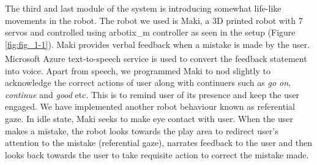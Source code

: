 The third and last module of the system is introducing somewhat life-like movements in the robot. The robot we used is Maki, a 3D printed robot with 7 servos and controlled using arbotix\_m controller as seen in the setup (Figure \ref{fig:fig_1-1}). Maki provides verbal feedback when a mistake is made by the user. Microsoft\textsuperscript\textregistered{} Azure text-to-speech service is used to convert the feedback statement into voice. Apart from speech, we programmed Maki to nod slightly to acknowledge the correct actions of user along with continuers such as \emph{go on}, \emph{continue} and \emph{good} etc. This is to remind user of its presence and keep the user engaged. We have implemented another robot behaviour known as referential gaze. In idle state, Maki seeks to make eye contact with user. When the user makes a mistake, the robot looks towards the play area to redirect user's attention to the mistake (referential gaze), narrates feedback to the user and then looks back towards the user to take requisite action to correct the mistake made.















